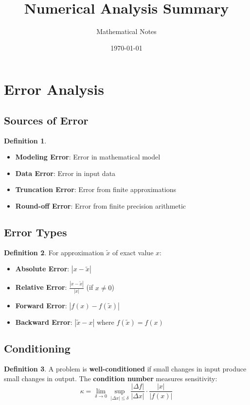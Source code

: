 \documentclass[11pt]{article}
\title{Numerical Analysis Summary}
\author{Mathematical Notes}
\date{\today}
\theoremstyle{definition}
\newtheorem{definition}{Definition}[section]
\begin{document}
\maketitle

\tableofcontents
\newpage

\section{Error Analysis}

\subsection{Sources of Error}
\begin{definition}
\begin{itemize}
    \item \textbf{Modeling Error}: Error in mathematical model
    \item \textbf{Data Error}: Error in input data
    \item \textbf{Truncation Error}: Error from finite approximations
    \item \textbf{Round-off Error}: Error from finite precision arithmetic
\end{itemize}
\end{definition}

\subsection{Error Types}
\begin{definition}
For approximation $\tilde{x}$ of exact value $x$:
\begin{itemize}
    \item \textbf{Absolute Error}: $|x - \tilde{x}|$
    \item \textbf{Relative Error}: $\frac{|x - \tilde{x}|}{|x|}$ (if $x \neq 0$)
    \item \textbf{Forward Error}: $|f(x) - f(\tilde{x})|$
    \item \textbf{Backward Error}: $|\tilde{x} - x|$ where $f(\tilde{x}) = f(x)$
\end{itemize}
\end{definition}

\subsection{Conditioning}
\begin{definition}
A problem is \textbf{well-conditioned} if small changes in input produce small changes in output. The \textbf{condition number} measures sensitivity:
$$\kappa = \lim_{\delta \to 0} \sup_{|\Delta x| \leq \delta} \frac{|\Delta f|}{|\Delta x|} \cdot \frac{|x|}{|f(x)|}$$
\end{definition}
\end{document}
